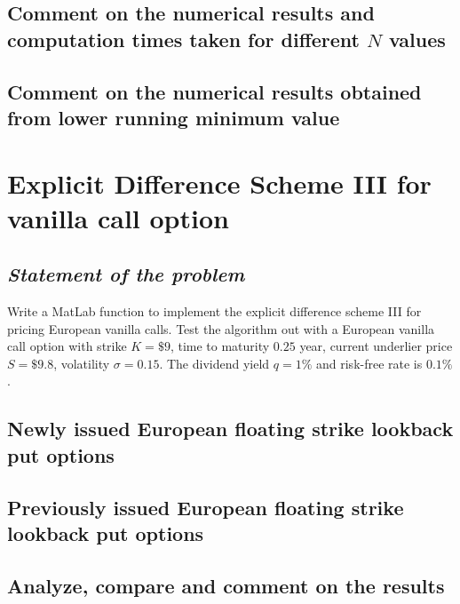 \subsection{Comment on the numerical results and computation times taken for different $N$ values}

\subsection{Comment on the numerical results obtained from lower running minimum value}

\section{Explicit Difference Scheme III for vanilla call option}
\subsection*{\emph{Statement of the problem}}
Write a MatLab function to implement the explicit difference scheme III for pricing European vanilla calls. Test the algorithm out with a European vanilla call option with strike $K = \$9$, time to maturity $0.25$ year, current underlier price $S = \$9.8$, volatility $\sigma=0.15$. The dividend yield $q = 1\%$ and risk-free rate is $0.1\%$.

\subsection{Newly issued European floating strike lookback put options}

\subsection{Previously issued European floating strike lookback put options}

\subsection{Analyze, compare and comment on the results}

